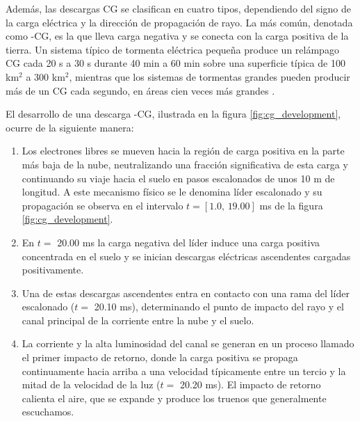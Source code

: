 \documentclass[11pt,oneside,openany,letter]{book}
\begin{document}
Adem\'as, las descargas CG se clasifican en cuatro tipos, dependiendo del signo de la carga eléctrica y la dirección de propagación de rayo. La m\'as com\'un, denotada como -CG, es la que lleva carga negativa y se conecta con la carga positiva de la tierra. Un sistema típico de tormenta eléctrica pequeña produce un relámpago CG cada 20 s a 30 s durante 40 min a 60 min sobre una superficie típica de 100 km$^{2}$ a 300 km$^{2}$, mientras que los sistemas de tormentas grandes pueden producir más de un CG cada segundo, en áreas cien veces más grandes \cite{DwyerUman2014}.

El desarrollo de una descarga -CG, ilustrada en la figura \ref{fig:cg_development}, ocurre de la siguiente manera\cite{DwyerUman2014}: 

\begin{enumerate}
    \item Los electrones libres se mueven hacia la región de carga positiva en la parte más baja de la nube, neutralizando una fracción significativa de esta carga y continuando su viaje hacia el suelo en pasos escalonados de unos 10 m de longitud. A este mecanismo físico se le denomina líder escalonado y su propagaci\'on se observa en el intervalo $t=[\text{1.0},\, \text{19.00}]$ ms de la figura \ref{fig:cg_development}. 
    
    \item En $t=$ 20.00 ms la carga negativa del l\'ider induce una carga positiva concentrada en el suelo y se inician descargas eléctricas ascendentes cargadas positivamente. 
    
    \item Una de estas descargas ascendentes entra en contacto con una rama del líder escalonado ($t=$ 20.10 ms), determinando el punto de impacto del rayo y el canal principal de la corriente entre la nube y el suelo.
    
    \item La corriente y la alta luminosidad del canal se generan en un proceso llamado el primer impacto de retorno, donde la carga positiva se propaga continuamente hacia arriba a una velocidad típicamente entre un tercio y la mitad de la velocidad de la luz ($t=$ 20.20 ms). El impacto de retorno calienta el aire, que se expande y produce los truenos que generalmente escuchamos.
\end{enumerate}
   
\end{document}
